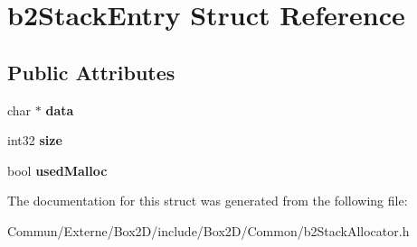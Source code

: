 \hypertarget{structb2_stack_entry}{}\section{b2\+Stack\+Entry Struct Reference}
\label{structb2_stack_entry}
\subsection*{Public Attributes}
\begin{DoxyCompactItemize}
\item 
char $\ast$ {\bfseries data}\hypertarget{structb2_stack_entry_af98aedeec2c20af0b7d3508a687ddd86}{}\label{structb2_stack_entry_af98aedeec2c20af0b7d3508a687ddd86}

\item 
int32 {\bfseries size}\hypertarget{structb2_stack_entry_a910c62f05317f8906224b2569e0cb344}{}\label{structb2_stack_entry_a910c62f05317f8906224b2569e0cb344}

\item 
bool {\bfseries used\+Malloc}\hypertarget{structb2_stack_entry_a581b5e4699bb66a28ec0727497a4e478}{}\label{structb2_stack_entry_a581b5e4699bb66a28ec0727497a4e478}

\end{DoxyCompactItemize}


The documentation for this struct was generated from the following file\+:\begin{DoxyCompactItemize}
\item 
Commun/\+Externe/\+Box2\+D/include/\+Box2\+D/\+Common/b2\+Stack\+Allocator.\+h\end{DoxyCompactItemize}
